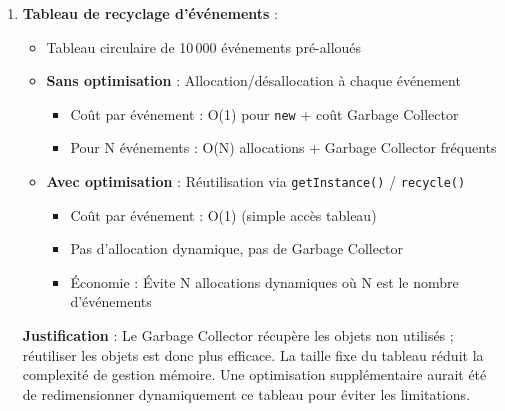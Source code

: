 \documentclass[12pt,a4paper]{article}
\begin{document}
\begin{enumerate}
    \item \textbf{Tableau de recyclage d'événements} : 
    \begin{itemize}
        \item Tableau circulaire de 10\,000 événements pré-alloués
        \item \textbf{Sans optimisation} : Allocation/désallocation à chaque événement
        \begin{itemize}
            \item Coût par événement : O(1) pour \texttt{new} + coût Garbage Collector
            \item Pour N événements : O(N) allocations + Garbage Collector fréquents
        \end{itemize}
        \item \textbf{Avec optimisation} : Réutilisation via \texttt{getInstance()} / \texttt{recycle()}
        \begin{itemize}
            \item Coût par événement : O(1) (simple accès tableau)
            \item Pas d'allocation dynamique, pas de Garbage Collector
            \item Économie : Évite N allocations dynamiques où N est le nombre d'événements
        \end{itemize}
    \end{itemize}
    
    \textbf{Justification} : Le Garbage Collector récupère les objets non utilisés ; réutiliser les objets est donc plus efficace. La taille fixe du tableau réduit la complexité de gestion mémoire. Une optimisation supplémentaire aurait été de redimensionner dynamiquement ce tableau pour éviter les limitations.
    

\end{enumerate}
\end{document}
